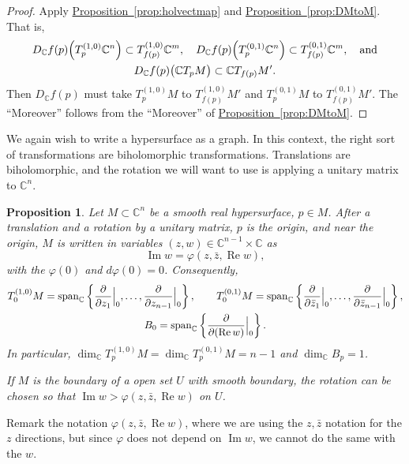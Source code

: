 \documentclass[12pt,openany]{book}
\newcommand{\avoidbreak}{\postdisplaypenalty=100}
\renewcommand{\Re}{\operatorname{Re}}
\renewcommand{\Im}{\operatorname{Im}}
\newcommand{\C}{{\mathbb{C}}}
\theoremstyle{plain}
\newtheorem{prop}[thm]{Proposition}
\theoremstyle{remark}
\theoremstyle{definition}
\theoremstyle{exercise}
\theoremstyle{example}
\newcommand{\propref}[1]{\hyperref[#1]{Proposition~\ref*{#1}}}
\begin{document}
\begin{proof}
Apply \propref{prop:holvectmap} and
\propref{prop:DMtoM}.
That is,
\begin{multline*}
D_\C f(p)\Bigl(T_p^{(1,0)}\C^n\Bigr) \subset T_{f(p)}^{(1,0)}\C^m, \quad
D_\C f(p)\Bigl(T_p^{(0,1)}\C^n\Bigr) \subset T_{f(p)}^{(0,1)}\C^m, \quad
\text{and} \\
D_\C f(p)\bigl(\C T_pM\bigr) \subset \C T_{f(p)}M' .
\avoidbreak
\end{multline*}
Then $D_\C f(p)$ must take
$T_p^{(1,0)}M$ to $T_{f(p)}^{(1,0)}M'$ and
$T_p^{(0,1)}M$ to $T_{f(p)}^{(0,1)}M'$.
The ``Moreover'' follows
from the ``Moreover'' of \propref{prop:DMtoM}.
\end{proof}

We again wish to write a hypersurface as a graph.  In this context, the
right sort of transformations are biholomorphic transformations.
Translations are biholomorphic, and
the rotation we will want to use is applying a unitary matrix to $\C^n$.

\begin{prop} \label{prop:graphcoordinatesCn}
\pagebreak[2]
Let $M \subset \C^n$ be a smooth real hypersurface, $p \in M$.
After a translation and a rotation by a unitary
matrix, $p$ is the origin, and near the origin,
$M$ is written in variables $(z,w) \in \C^{n-1}
\times \C$ as
\begin{equation*}
\Im w = \varphi(z,\bar{z},\Re w) ,
\end{equation*}
with the $\varphi(0)$  and $d\varphi(0) = 0$.  Consequently,
\begin{gather*}
T_0^{(1,0)} M
= \operatorname{span}_{\C} \left\{
\frac{\partial}{\partial z_1}\Big|_0,
\ldots,
\frac{\partial}{\partial z_{n-1}}\Big|_0 \right\} ,
\qquad
T_0^{(0,1)} M
= \operatorname{span}_{\C} \left\{
\frac{\partial}{\partial \bar{z}_1}\Big|_0,
\ldots,
\frac{\partial}{\partial \bar{z}_{n-1}}\Big|_0 \right\} ,
\\
B_0 = \operatorname{span}_{\C} \left\{
\frac{\partial}{\partial (\Re w)}\Big|_0 \right\} .
\avoidbreak
\end{gather*}
In particular,
$\dim_\C T_p^{(1,0)} M = \dim_\C T_p^{(0,1)} M = n-1$ and
$\dim_\C B_p = 1$.

\nopagebreak
If $M$ is the boundary of a open set $U$ with smooth boundary,
the rotation can be chosen so that
$\Im w > \varphi(z,\bar{z},\Re w)$ on $U$.
\end{prop}

Remark the notation $\varphi(z,\bar{z},\Re w)$, where we are using the
$z,\bar{z}$ notation for the $z$ directions, but since $\varphi$ does not
depend on $\Im w$, we cannot do the same with the $w$.
\end{document}
